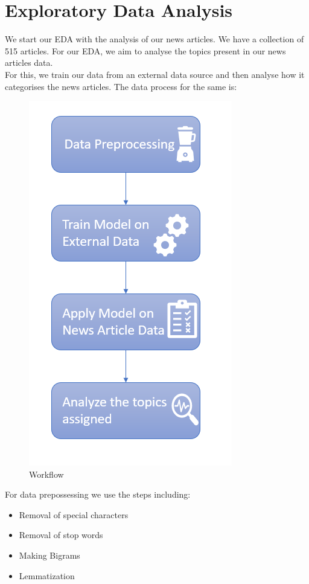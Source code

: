 \documentclass{article}
\begin{document}
\section{Exploratory Data Analysis}

We start our EDA with the analysis of our news articles. We have a collection of 515 articles. For our EDA, we aim to analyse the topics present in our news articles data. \\
 For this, we train our data from an external data source and then analyse how it categorises the news articles. The data process for the same is: \\

\begin{figure}[H]
\centering
\includegraphics[scale=0.6]{lda_eda_process.PNG}
\caption{Workflow}
\end{figure}

For data prepossessing we use the steps including:
\begin{itemize}
\item Removal of special characters
\item Removal of stop words
\item Making Bigrams 
\item Lemmatization
\end{itemize}
\end{document}
